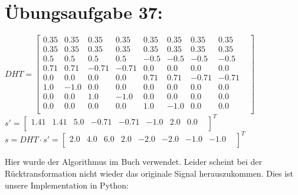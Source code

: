 

	\section*{Übungsaufgabe 37:}

	$
    DHT =
    \begin{bmatrix}
    0.35 & 0.35 & 0.35 & 0.35 & 0.35 & 0.35 & 0.35 & 0.35 & \\
    0.35 & 0.35 & 0.35 & 0.35 & 0.35 & 0.35 & 0.35 & 0.35 & \\
    0.5 & 0.5 & 0.5 & 0.5 & -0.5 & -0.5 & -0.5 & -0.5 & \\
    0.71 & 0.71 & -0.71 & -0.71 & 0.0 & 0.0 & 0.0 & 0.0 & \\
    0.0 & 0.0 & 0.0 & 0.0 & 0.71 & 0.71 & -0.71 & -0.71 & \\
    1.0 & -1.0 & 0.0 & 0.0 & 0.0 & 0.0 & 0.0 & 0.0 & \\
    0.0 & 0.0 & 1.0 & -1.0 & 0.0 & 0.0 & 0.0 & 0.0 & \\
    0.0 & 0.0 & 0.0 & 0.0 & 1.0 & -1.0 & 0.0 & 0.0 & \\
    \end{bmatrix}
    $ \\ $
    s' =
    \begin{bmatrix}
    1.41 & 1.41 & 5.0 & -0.71 & -0.71 & -1.0 & 2.0 & 0.0 & \\
    \end{bmatrix}
    ^T $ \\ $
    s = DHT \cdot s' =
    \begin{bmatrix}
    2.0 & 4.0 & 6.0 & 2.0 & -2.0 & -2.0 & -1.0 & -1.0 & \\
    \end{bmatrix}
    ^T $ \newline

    Hier wurde der Algorithmus im Buch verwendet. Leider scheint bei der Rücktransformation nicht wieder das originale Signal herauszukommen.
    Dies ist unsere Implementation in Python: \newline
    



